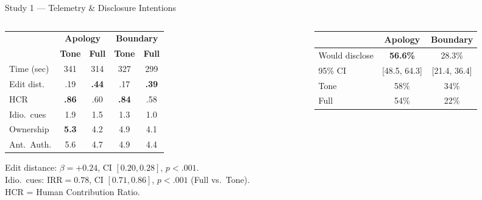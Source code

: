 \documentclass[10pt,aspectratio=169]{beamer}
\begin{document}
\begin{frame}{Study 1 --- Telemetry \& Disclosure Intentions}
\vspace{1pt}
\begin{columns}[T]
\begin{column}{0.48\textwidth}
  \scriptsize
  \renewcommand{\arraystretch}{1.15}
  \begin{center}
  \begin{tabular}{@{}l cc cc@{}}
    \toprule
    & \multicolumn{2}{c}{\textbf{Apology}} & \multicolumn{2}{c}{\textbf{Boundary}}\\
    \cmidrule(lr){2-3}\cmidrule(lr){4-5}
    & \textbf{Tone} & \textbf{Full} & \textbf{Tone} & \textbf{Full}\\
    \midrule
    Time (sec) & 341 & 314 & 327 & 299\\
    Edit dist. & .19 & \textcolor{chiRed}{\textbf{.44}} & .17 & \textcolor{chiRed}{\textbf{.39}}\\
    HCR & \textcolor{chiGreen}{\textbf{.86}} & .60 & \textcolor{chiGreen}{\textbf{.84}} & .58\\
    Idio.\ cues & 1.9 & 1.5 & 1.3 & 1.0\\
    Ownership & \textcolor{chiGreen}{\textbf{5.3}} & 4.2 & 4.9 & \textcolor{chiRed}{4.1}\\
    Ant.\ Auth. & 5.6 & 4.7 & 4.9 & 4.4\\
    \bottomrule
  \end{tabular}
  \end{center}
  \vspace{3pt}
  {\scriptsize\textcolor{chiGray}{Edit distance: $\beta{=}{+}0.24$, CI $[0.20,0.28]$, $p{<}.001$.\\
   Idio.\ cues: IRR${}=0.78$, CI $[0.71,0.86]$, $p{<}.001$ (Full vs.\ Tone).\\
   HCR = Human Contribution Ratio.}}
\end{column}
\begin{column}{0.48\textwidth}
  \begin{alertbox}
  \scriptsize
  \begin{tabular}{@{}lcc@{}}
    & \textbf{Apology} & \textbf{Boundary}\\
    \midrule
    Would disclose & \textbf{56.6\%} & 28.3\%\\
    {\scriptsize 95\% CI} & {\scriptsize [48.5, 64.3]} & {\scriptsize [21.4, 36.4]}\\
    \midrule
    Tone & 58\% & 34\%\\
    Full & 54\% & 22\%\\
  \end{tabular}
  \vspace{3pt}


\end{alertbox}
\end{column}
\end{columns}
\end{frame}
\end{document}
